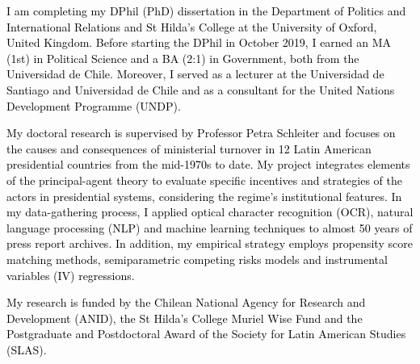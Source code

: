 




\vspace{3mm}

\begin{cvparagraph}

\textcolor{black}{I am completing my DPhil (PhD) dissertation in the Department of Politics and International Relations and St Hilda’s College at the University of Oxford, United Kingdom. Before starting the DPhil in October 2019, I earned an MA (1st) in Political Science and a BA (2:1) in Government, both from the Universidad de Chile. Moreover, I served as a lecturer at the Universidad de Santiago and Universidad de Chile and as a consultant for the United Nations Development Programme (UNDP).}

\textcolor{black}{My doctoral research is supervised by Professor Petra Schleiter and focuses on the causes and consequences of ministerial turnover in 12 Latin American presidential countries from the mid-1970s to date. My project integrates elements of the principal-agent theory to evaluate specific incentives and strategies of the actors in presidential systems, considering the regime’s institutional features. In my data-gathering process, I applied optical character recognition (OCR), natural language processing (NLP) and machine learning techniques to almost 50 years of press report archives. In addition, my empirical strategy employs propensity score matching methods, semiparametric competing risks models and instrumental variables (IV) regressions.}

\textcolor{black}{My research is funded by the Chilean National Agency for Research and Development (ANID), the St Hilda’s College Muriel Wise Fund and the Postgraduate and Postdoctoral Award of the Society for Latin American Studies (SLAS).}
\vspace{1mm}
\end{cvparagraph}
